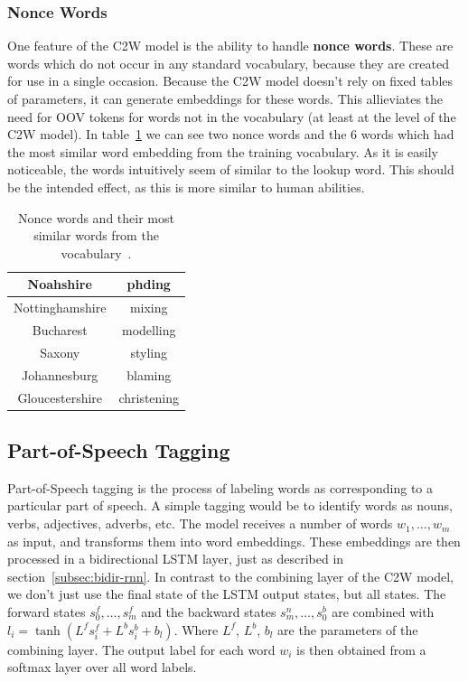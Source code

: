 \subsubsection{Nonce Words}

One feature of the C2W model is the ability to handle \textbf{nonce words}. These are words which do not occur in
any standard vocabulary, because they are created for use in a single occasion.
Because the C2W model doesn't rely on fixed tables of parameters, it can generate embeddings for these words.
This allieviates the need for OOV tokens for words not in the vocabulary (at least at the level of the C2W model).
In table~\ref{tab:nonce} we can see two nonce words and the 6 words which had the most similar word embedding
from the training vocabulary. As it is easily noticeable, the words intuitively seem of similar to the lookup word. 
This should be the intended effect, as this is more similar to human abilities.

\begin{table}
\centering
\begin{tabular}{ c | c }
   Noahshire &  phding \\ \hline
   Nottinghamshire & mixing \\
   Bucharest & modelling \\
   Saxony & styling \\
   Johannesburg & blaming \\
   Gloucestershire & christening \\
\end{tabular}
\caption{Nonce words and their most similar words from the vocabulary~\cite{DBLP:journals/corr/LingLMAADBT15}.}
\label{tab:nonce}
\end{table}


\subsection{Part-of-Speech Tagging}

Part-of-Speech tagging is the process of labeling words as corresponding to a particular part of speech. A simple tagging would be
to identify words as nouns, verbs, adjectives, adverbs, etc.
The model receives a number of words $w_1,\dots,w_m$ as input, and transforms them into word embeddings. These embeddings are then processed
in a bidirectional LSTM layer, just as described in section~\ref{subsec:bidir-rnn}. 
In contrast to the combining layer of the C2W model, we don't just use the final state of the LSTM output states, but all states.
The forward states $s^f_0,\dots,s^f_m$ and the backward states  $s^n_m,\dots,s^b_0$ are combined with  $l_i = \tanh(L^f s_i^f + L^b s^b_i + b_l)$.
Where $L^f$, $L^b$, $b_l$ are the parameters of the combining layer. The output label for each word $w_i$ is then obtained from a softmax layer over
all word labels.

